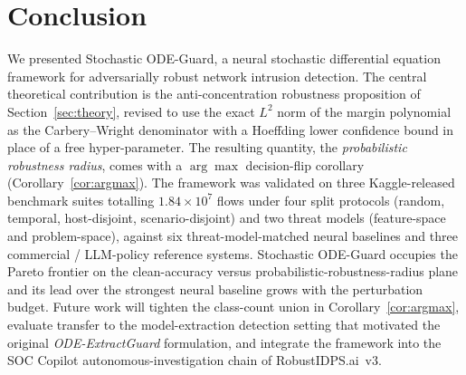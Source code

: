 \documentclass{ieeeaccess}
\begin{document}
\section{Conclusion}\label{sec:conc}
We presented Stochastic ODE-Guard, a neural stochastic differential
equation framework for adversarially robust network intrusion
detection. The central theoretical contribution is the
anti-concentration robustness proposition of
Section~\ref{sec:theory}, revised to use the exact $L^{2}$ norm of the
margin polynomial as the Carbery--Wright denominator with a Hoeffding
lower confidence bound in place of a free hyper-parameter. The
resulting quantity, the \emph{probabilistic robustness radius}, comes
with a $\arg\max$ decision-flip corollary
(Corollary~\ref{cor:argmax}). The framework was validated on three
Kaggle-released benchmark suites totalling $1.84\times 10^{7}$ flows
under four split protocols (random, temporal, host-disjoint,
scenario-disjoint) and two threat models (feature-space and
problem-space), against six threat-model-matched neural baselines and
three commercial / LLM-policy reference systems. Stochastic ODE-Guard
occupies the Pareto frontier on the clean-accuracy versus
probabilistic-robustness-radius plane and its lead over the strongest
neural baseline grows with the perturbation budget. Future work will
tighten the class-count union in Corollary~\ref{cor:argmax}, evaluate
transfer to the model-extraction detection setting that motivated the
original \textit{ODE-ExtractGuard} formulation, and integrate the
framework into the SOC Copilot autonomous-investigation chain of
RobustIDPS.ai~v3.

\appendices
\end{document}
